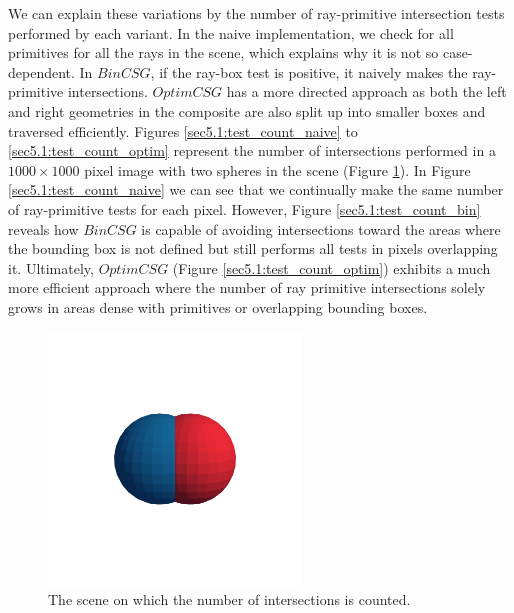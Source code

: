 \documentclass[a4paper,11pt,oneside]{article}
\begin{document}
We can explain these variations by the number of ray-primitive intersection tests performed by each variant. In the naive implementation, we check for all primitives for all the rays in the scene, which explains why it is not so case-dependent. In $BinCSG$, if the ray-box test is positive, it naively makes the ray-primitive intersections. $OptimCSG$ has a more directed approach as both the left and right geometries in the composite are also split up into smaller boxes and traversed efficiently. Figures \ref{sec5.1:test_count_naive} to \ref{sec5.1:test_count_optim} represent the number of intersections performed in a $1000 \times 1000$ pixel image with two spheres in the scene (Figure \ref{sec5.1:test_count_render}). In Figure \ref{sec5.1:test_count_naive} we can see that we continually make the same number of ray-primitive tests for each pixel. However, Figure \ref{sec5.1:test_count_bin} reveals how $BinCSG$ is capable of avoiding intersections toward the areas where the bounding box is not defined but still performs all tests in pixels overlapping it. Ultimately, $OptimCSG$ (Figure \ref{sec5.1:test_count_optim}) exhibits a much more efficient approach where the number of ray primitive intersections solely grows in areas dense with primitives or overlapping bounding boxes.

\begin{figure}[H]
	\centering
	\includegraphics[width=0.6\textwidth]{section5/plots/union.png}
	\caption{The scene on which the number of intersections is counted.}
	\label{sec5.1:test_count_render}
\end{figure}
\end{document}
